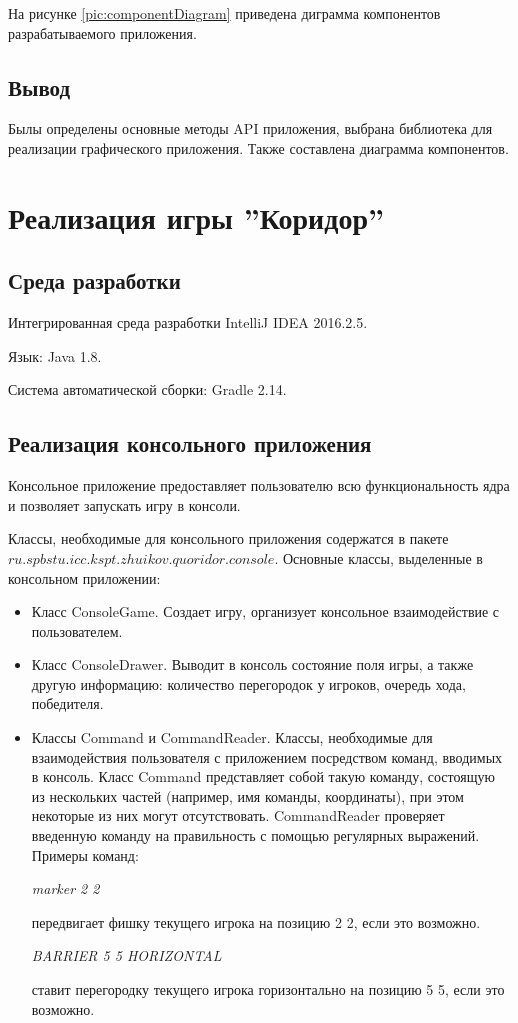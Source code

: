 \documentclass[a4paper]{article}
\begin{document}
На рисунке \ref{pic:componentDiagram} приведена диграмма компонентов разрабатываемого приложения.
\subsection{Вывод}
Былы определены основные методы API приложения, выбрана библиотека для реализации графического приложения. Также составлена диаграмма компонентов. 
\section{Реализация игры ''Коридор''}
\subsection{Среда разработки}

\noindent Интегрированная среда разработки IntelliJ IDEA 2016.2.5. 

\noindent Язык: Java 1.8.

\noindent Система автоматической сборки: Gradle 2.14.

\subsection{Реализация консольного приложения}
Консольное приложение предоставляет пользователю всю функциональность ядра и позволяет запускать игру в консоли. 

\noindent Классы, необходимые для консольного приложения содержатся в пакете $ ru.spbstu.icc.kspt.zhuikov.quoridor.console$. 
Основные классы, выделенные в консольном приложении:
\begin{itemize}
\item Класс ConsoleGame. Создает игру, организует консольное взаимодействие с пользователем. 
\item Класс ConsoleDrawer. Выводит в консоль состояние поля игры, а также другую информацию: количество перегородок у игроков, очередь хода, победителя.
\item Классы Command и CommandReader. Классы, необходимые для взаимодействия пользователя с приложением посредством команд, вводимых в консоль. Класс Command представляет собой такую команду, состоящую из нескольких частей (например, имя команды, координаты), при этом некоторые из них могут отсутствовать. CommandReader проверяет введенную команду на правильность с помощью регулярных выражений. Примеры команд:
\begin{center}
\textit{marker 2 2} 
\end{center} передвигает фишку текущего игрока на позицию 2 2, если это возможно. 
\begin{center}
\textit{BARRIER 5 5 HORIZONTAL} 
\end{center} 
ставит перегородку текущего игрока горизонтально на позицию 5 5, если это возможно. 
\end{itemize}
\end{document}
